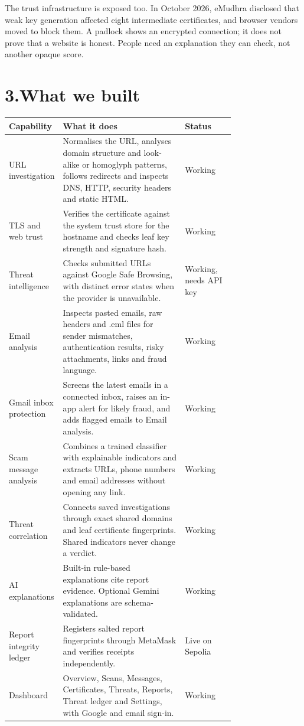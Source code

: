 \documentclass[11pt,a4paper]{article}
\begin{document}
The trust infrastructure is exposed too. In October 2026, eMudhra disclosed that weak key generation affected eight intermediate certificates, and browser vendors moved to block them. A padlock shows an encrypted connection; it does not prove that a website is honest. People need an explanation they can check, not another opaque score.

\section{3.\quad What we built}
\begin{tabularx}{\linewidth}{@{}>{\raggedright\arraybackslash}p{0.220\linewidth}>{\raggedright\arraybackslash}p{0.540\linewidth}>{\raggedright\arraybackslash}X@{}}
\toprule
\textbf{Capability} & \textbf{What it does} & \textbf{Status} \\
\midrule
URL investigation & Normalises the URL, analyses domain structure and look-alike or homoglyph patterns, follows redirects and inspects DNS, HTTP, security headers and static HTML. & Working \\
TLS and web trust & Verifies the certificate against the system trust store for the hostname and checks leaf key strength and signature hash. & Working \\
Threat intelligence & Checks submitted URLs against Google Safe Browsing, with distinct error states when the provider is unavailable. & Working, needs API key \\
Email analysis & Inspects pasted emails, raw headers and .eml files for sender mismatches, authentication results, risky attachments, links and fraud language. & Working \\
Gmail inbox protection & Screens the latest emails in a connected inbox, raises an in-app alert for likely fraud, and adds flagged emails to Email analysis. & Working \\
Scam message analysis & Combines a trained classifier with explainable indicators and extracts URLs, phone numbers and email addresses without opening any link. & Working \\
Threat correlation & Connects saved investigations through exact shared domains and leaf certificate fingerprints. Shared indicators never change a verdict. & Working \\
AI explanations & Built-in rule-based explanations cite report evidence. Optional Gemini explanations are schema-validated. & Working \\
Report integrity ledger & Registers salted report fingerprints through MetaMask and verifies receipts independently. & Live on Sepolia \\
Dashboard & Overview, Scans, Messages, Certificates, Threats, Reports, Threat ledger and Settings, with Google and email sign-in. & Working \\
\bottomrule
\end{tabularx}
\vspace{4pt}
\end{document}
